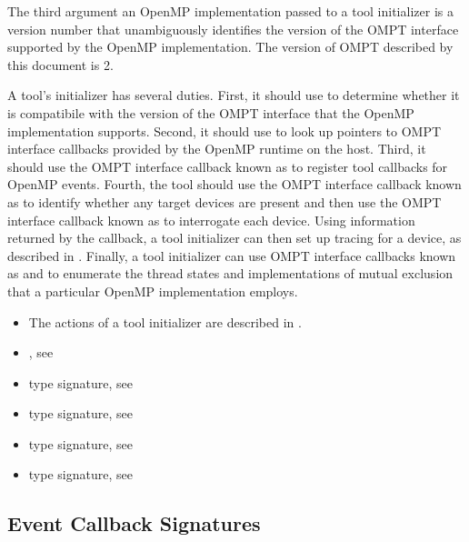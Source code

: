 The third argument an OpenMP implementation passed to a tool initializer 
is a version number that unambiguously identifies the version of the 
OMPT interface supported by the OpenMP implementation.  
The version of OMPT described by this document is 2.

\effect
A tool's initializer has several duties.  First, it should use
 to determine whether it is compatibile
with the version of the OMPT interface that the OpenMP implementation
supports.  Second, it should use  
to look up pointers to OMPT interface callbacks provided by the
OpenMP runtime on the host. 
Third, it should use the OMPT interface 
callback known as  
to register tool callbacks for OpenMP events.  Fourth, the tool
should use the OMPT interface callback known as  
to identify whether any target devices are present
and then use the OMPT interface callback known as 
 to interrogate each device.
Using information returned by the  callback,
a tool initializer can then set up tracing for a device, 
as described in . 
Finally, a tool initializer can use OMPT interface callbacks known as 
 and  to
enumerate the thread states and implementations of mutual exclusion
that a particular OpenMP implementation employs.

\crossreferences
\begin{itemize}
\item The actions of a tool initializer are described in 
.
\item {}, see 
\item {} type signature, see 
\item {} type signature, see 
\item {} type signature, see 
\item {} type signature, see 
\end{itemize}


\subsection{Event Callback Signatures}
\label{sec:ToolsSupport_callback_signatures}

